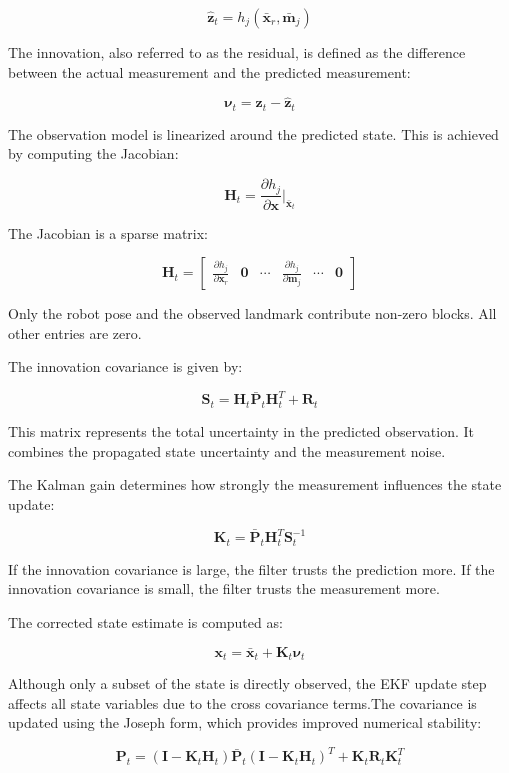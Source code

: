 \documentclass[11pt]{article}
\begin{document}
\[
\hat{\mathbf{z}}_t = h_j(\bar{\mathbf{x}}_r, \bar{\mathbf{m}}_j)
\]

The innovation, also referred to as the residual, is defined as the difference
between the actual measurement and the predicted measurement:

\[
\boldsymbol{\nu}_t = \mathbf{z}_t - \hat{\mathbf{z}}_t
\]

The observation model is linearized around the predicted state. This is achieved by computing the Jacobian:

\[
\mathbf{H}_t =
\frac{\partial h_j}{\partial \mathbf{x}}
\bigg|_{\bar{\mathbf{x}}_t}
\]

The Jacobian is a sparse matrix:

\[
\mathbf{H}_t =
\begin{bmatrix}
	\frac{\partial h_j}{\partial \mathbf{x}_r} &
	\mathbf{0} &
	\cdots &
	\frac{\partial h_j}{\partial \mathbf{m}_j} &
	\cdots &
	\mathbf{0}
\end{bmatrix}
\]

Only the robot pose and the observed landmark contribute non-zero blocks. All other entries are zero.


The innovation covariance is given by:

\[
\mathbf{S}_t =
\mathbf{H}_t \bar{\mathbf{P}}_t \mathbf{H}_t^T
+
\mathbf{R}_t
\]

This matrix represents the total uncertainty in the predicted observation.
It combines the propagated state uncertainty and the measurement noise.

The Kalman gain determines how strongly the measurement influences the state update:

\[
\mathbf{K}_t =
\bar{\mathbf{P}}_t \mathbf{H}_t^T \mathbf{S}_t^{-1}
\]

If the innovation covariance is large, the filter trusts the prediction more.
If the innovation covariance is small, the filter trusts the measurement more.

The corrected state estimate is computed as:

\[
\mathbf{x}_t =
\bar{\mathbf{x}}_t + \mathbf{K}_t \boldsymbol{\nu}_t
\]

Although only a subset of the state is directly observed, the EKF update step affects all state variables due to the cross covariance terms.The covariance is updated using the Joseph form, which provides improved numerical stability:

\[
\mathbf{P}_t =
(\mathbf{I} - \mathbf{K}_t \mathbf{H}_t)
\bar{\mathbf{P}}_t
(\mathbf{I} - \mathbf{K}_t \mathbf{H}_t)^T
+
\mathbf{K}_t \mathbf{R}_t \mathbf{K}_t^T
\]
\end{document}
